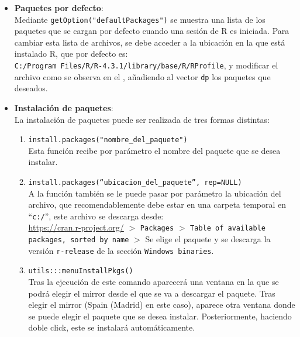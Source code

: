 \documentclass[12pt]{report}\usepackage[]{graphicx}\usepackage[dvipsnames]{xcolor}
\begin{document}
			\begin{itemize}
				\item \textbf{Paquetes por defecto}: \\
				Mediante \texttt{getOption("defaultPackages")} se muestra una lista de los paquetes que se cargan por defecto cuando una sesión de R es iniciada. Para cambiar esta lista de archivos, se debe acceder a la ubicación en la que está instalado R, que por defecto es:\\\texttt{C:/Program Files/R/R-4.3.1/library/base/R/RProfile}, y modificar el archivo como se observa en el , añadiendo al vector \texttt{dp} los paquetes que deseados.
				
				
				
				\item \textbf{Instalación de paquetes}: \\
				La instalación de paquetes puede ser realizada de tres formas distintas:
				
				\begin{enumerate}[label = \textbf{\arabic*. }]
					\item \texttt{install.packages("nombre\_del\_paquete")}\\
					Esta función recibe por parámetro el nombre del paquete que se desea instalar.
					
					\item \texttt{install.packages(``ubicacion\_del\_paquete'', rep=NULL)}\\
					A la función también se le puede pasar por parámetro la ubicación del archivo, que recomendablemente debe estar en una carpeta temporal en ``\texttt{c:/}'', este archivo se descarga desde:\\ \url{https://cran.r-project.org/} $>$ \texttt{Packages} $>$ \texttt{Table of available packages, sorted by name} $>$ Se elige el paquete y se descarga la versión \texttt{r-release} de la sección \texttt{Windows binaries}.
					
					\item \texttt{utils:::menuInstallPkgs()}\\
					Tras la ejecución de este comando aparecerá una ventana en la que se podrá elegir el mirror desde el que se va a descargar el paquete. Tras elegir el mirror (Spain (Madrid) en este caso), aparece otra ventana donde se puede elegir el paquete que se desea instalar. Posteriormente, haciendo doble click, este se instalará automáticamente.
				\end{enumerate}
				

\end{itemize}
\end{document}
